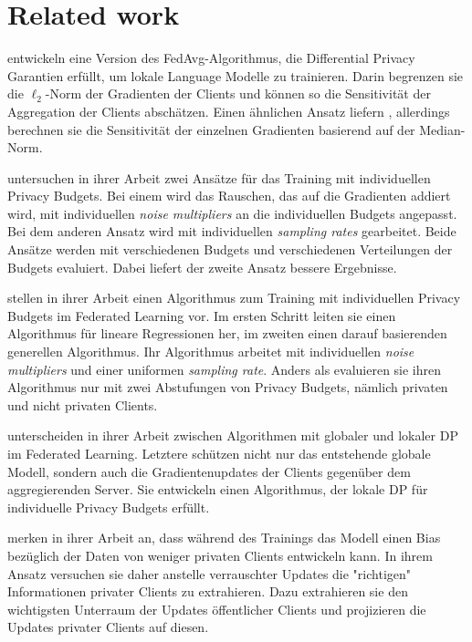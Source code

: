 \chapter{Related work}

\textcite{mcmahan:2018} entwickeln eine Version des FedAvg-Algorithmus, die Differential Privacy Garantien erfüllt, um lokale Language Modelle zu trainieren. Darin begrenzen sie die $\ell_2$-Norm der Gradienten der Clients und können so die Sensitivität der Aggregation der Clients abschätzen. Einen ähnlichen Ansatz liefern \textcite{geyer:2017}, allerdings berechnen sie die Sensitivität der einzelnen Gradienten basierend auf der Median-Norm.

\textcite{boenisch:2023} untersuchen in ihrer Arbeit zwei Ansätze für das Training mit individuellen Privacy Budgets. Bei einem wird das Rauschen, das auf die Gradienten addiert wird, mit individuellen \textit{noise multipliers} an die individuellen Budgets angepasst. Bei dem anderen Ansatz wird mit individuellen \textit{sampling rates} gearbeitet. Beide Ansätze werden mit verschiedenen Budgets und verschiedenen Verteilungen der Budgets evaluiert. Dabei liefert der zweite Ansatz bessere Ergebnisse.

\textcite{aldaghri:2023} stellen in ihrer Arbeit einen Algorithmus zum Training mit individuellen Privacy Budgets im Federated Learning vor. Im ersten Schritt leiten sie einen Algorithmus für lineare Regressionen her, im zweiten einen darauf basierenden generellen Algorithmus. Ihr Algorithmus arbeitet mit individuellen \textit{noise multipliers} und einer uniformen \textit{sampling rate}. Anders als \citeauthor{boenisch:2023} evaluieren sie ihren Algorithmus nur mit zwei Abstufungen von Privacy Budgets, nämlich privaten und nicht privaten Clients.

\textcite{yang:2021} unterscheiden in ihrer Arbeit zwischen Algorithmen mit globaler und lokaler DP im Federated Learning. Letztere schützen nicht nur das entstehende globale Modell, sondern auch die Gradientenupdates der Clients gegenüber dem aggregierenden Server. Sie entwickeln einen Algorithmus, der lokale DP für individuelle Privacy Budgets erfüllt.

\textcite{liu:2021} merken in ihrer Arbeit an, dass während des Trainings das Modell einen Bias bezüglich der Daten von weniger privaten Clients entwickeln kann. In ihrem Ansatz versuchen sie daher anstelle verrauschter Updates die "richtigen" Informationen privater Clients zu extrahieren. Dazu extrahieren sie den wichtigsten Unterraum der Updates öffentlicher Clients und projizieren die Updates privater Clients auf diesen.

